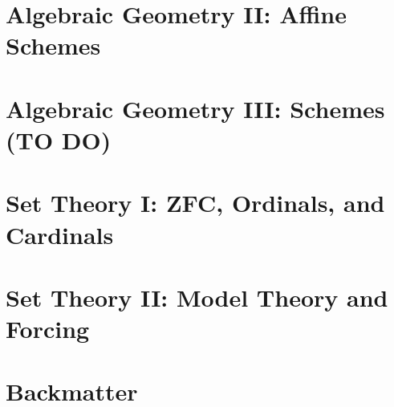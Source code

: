 \documentclass[11pt,twoside=semi,openright,numbers=noenddot]{scrbook}
\begin{document}
\part{Algebraic Geometry II: Affine Schemes}
\label{part:ag2}
\parttoc







\part{Algebraic Geometry III: Schemes (TO DO)}
\label{part:ag3}
\parttoc

\part{Set Theory I: ZFC, Ordinals, and Cardinals}
\label{part:st1}
\parttoc





\part{Set Theory II: Model Theory and Forcing}
\label{part:st2}
\parttoc




\part{Backmatter}
\parttoc
\appendix







\backmatter

\clearpage
\printbibliography[type=image,title={Image Attributions}]
\printbibliography[nottype=image]
\end{document}
